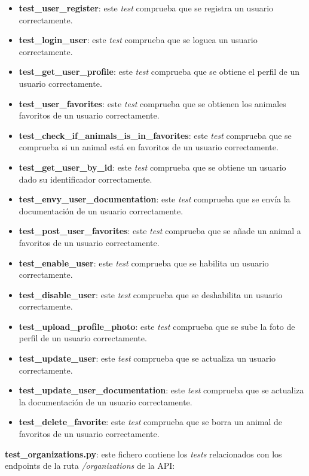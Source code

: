\begin{itemize}
    \item \textbf{test\_user\_register}: este \textit{test} comprueba que se registra un usuario correctamente.
    \item \textbf{test\_login\_user}: este \textit{test} comprueba que se loguea un usuario correctamente.
    \item \textbf{test\_get\_user\_profile}: este \textit{test} comprueba que se obtiene el perfil de un usuario correctamente.
    \item \textbf{test\_user\_favorites}: este \textit{test} comprueba que se obtienen los animales favoritos de un usuario correctamente.
    \item \textbf{test\_check\_if\_animals\_is\_in\_favorites}: este \textit{test} comprueba que se comprueba si un animal está en favoritos de un usuario correctamente.
    \item \textbf{test\_get\_user\_by\_id}: este \textit{test} comprueba que se obtiene un usuario dado su identificador correctamente.
    \item \textbf{test\_envy\_user\_documentation}: este \textit{test} comprueba que se envía la documentación de un usuario correctamente.
    \item \textbf{test\_post\_user\_favorites}: este \textit{test} comprueba que se añade un animal a favoritos de un usuario correctamente.
    \item \textbf{test\_enable\_user}: este \textit{test} comprueba que se habilita un usuario correctamente.
    \item \textbf{test\_disable\_user}: este \textit{test} comprueba que se deshabilita un usuario correctamente.
    \item \textbf{test\_upload\_profile\_photo}: este \textit{test} comprueba que se sube la foto de perfil de un usuario correctamente.
    \item \textbf{test\_update\_user}: este \textit{test} comprueba que se actualiza un usuario correctamente.
    \item \textbf{test\_update\_user\_documentation}: este \textit{test} comprueba que se actualiza la documentación de un usuario correctamente.
    \item \textbf{test\_delete\_favorite}: este \textit{test} comprueba que se borra un animal de favoritos de un usuario correctamente.
\end{itemize}

\textbf{test\_organizations.py}: este fichero contiene los \textit{tests} relacionados con los endpoints de la ruta \textit{/organizations} de la API:

